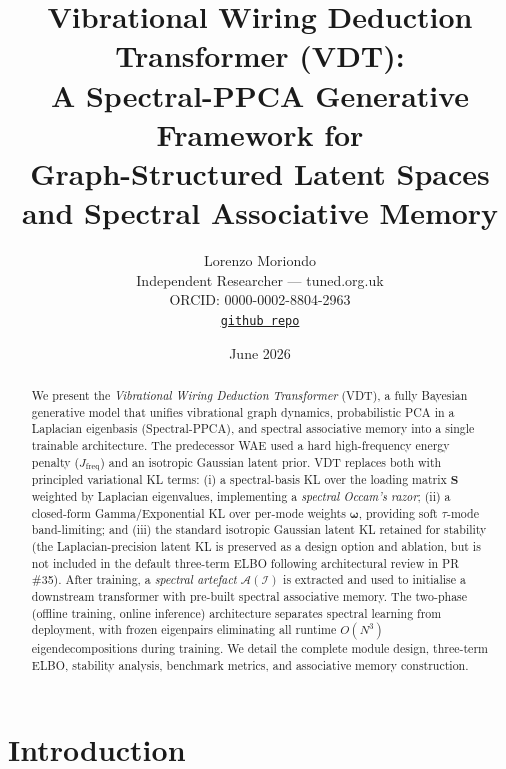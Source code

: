 \documentclass[11pt,a4paper]{article}
\title{%
  \textbf{Vibrational Wiring Deduction Transformer (VDT):}\\[4pt]
  \large A Spectral-PPCA Generative Framework for\\[2pt]
  Graph-Structured Latent Spaces and Spectral Associative Memory
}
\author{%
    Lorenzo Moriondo\\
    \small Independent Researcher --- tuned.org.uk\\
    \small ORCID: 0000-0002-8804-2963\\
    \href{https://github.com/tuned-org-uk/vibrational-deduction-transfomer}{\texttt{github repo}}
}
\date{June 2026}
\newcommand{\I}{\mathcal{I}}
\newcommand{\A}{\mathcal{A}}
\newcommand{\bS}{\bm{S}}
\newcommand{\bomega}{\bm{\omega}}
\begin{document}
\maketitle

\begin{abstract}
We present the \emph{Vibrational Wiring Deduction Transformer} (VDT), a
fully Bayesian generative model that unifies vibrational graph dynamics,
probabilistic PCA in a Laplacian eigenbasis (Spectral-PPCA), and spectral
associative memory into a single trainable architecture.  The predecessor
WAE used a hard high-frequency energy penalty
($J_{\mathrm{freq}}$) and an isotropic Gaussian latent prior.  VDT replaces
both with principled variational KL terms: (i) a spectral-basis KL over the
loading matrix $\bS$ weighted by Laplacian eigenvalues, implementing a
\emph{spectral Occam's razor}; (ii) a closed-form Gamma/Exponential KL over
per-mode weights $\bomega$, providing soft $\tau$-mode band-limiting; and
(iii) the standard isotropic Gaussian latent KL retained for stability (the
Laplacian-precision latent KL is preserved as a design option and ablation,
but is not included in the default three-term ELBO following architectural
review in PR\,\#35).  After training, a \emph{spectral artefact} $\A(\I)$ is
extracted and used to initialise a downstream transformer with pre-built
spectral associative memory.  The two-phase (offline training, online
inference) architecture separates spectral learning from deployment, with
frozen eigenpairs eliminating all runtime $O(N^3)$ eigendecompositions during
training.  We detail the complete module design, three-term ELBO, stability
analysis, benchmark metrics, and associative memory construction.
\end{abstract}

\tableofcontents
\newpage

\section{Introduction}
\label{sec:intro}
\end{document}
